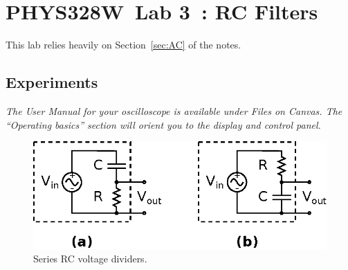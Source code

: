 \documentclass[11pt]{article}
\newcommand{\COURSE}{PHYS328W}
\newcommand{\LABNUM}{3}
\newcommand{\TITLE}{RC Filters}
\begin{document}
\thispagestyle{empty}

\section*{\COURSE\ Lab \LABNUM\ : \TITLE}

This lab relies heavily on Section~\ref{sec:AC} of the notes.

\subsection*{Experiments}

\emph{The User Manual for your oscilloscope is available under Files
  on Canvas. The ``Operating basics'' section will orient you to the 
  display and control panel.}

\begin{figure}[h]
\centering
\includegraphics{rcvdividers.eps}
\caption{Series RC voltage dividers.}
\label{fig:rcvdividers}
\end{figure}
\end{document}
